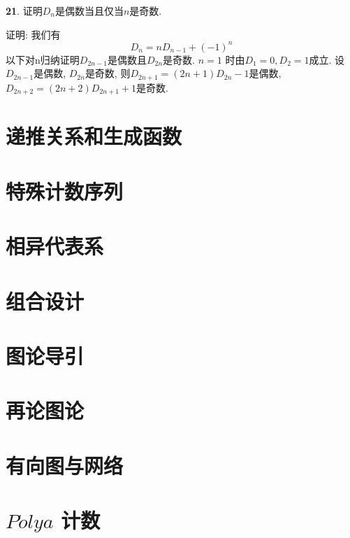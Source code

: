 \documentclass[12pt,a4paper]{article}
\begin{document}
\begin{CJK*}{GBK}{song}
\par \textbf{21}. 证明$D_n$是偶数当且仅当$n$是奇数.
\par 证明: 我们有
\begin{displaymath}
D_n=nD_{n-1}+(-1)^n
\end{displaymath}
以下对n归纳证明$D_{2n-1}$是偶数且$D_{2n}$是奇数. $n=1$ 时由$D_1=0,D_2=1$成立. 设$D_{2n-1}$是偶数, $D_{2n}$是奇数, 则$D_{2n+1}=(2n+1)D_{2n}-1$是偶数, $D_{2n+2}=(2n+2)D_{2n+1}+1$是奇数.

\section{递推关系和生成函数}

\section{特殊计数序列}

\section{相异代表系}

\section{组合设计}

\section{图论导引}

\section{再论图论}

\section{有向图与网络}

\section{$P\acute{o}lya$ 计数}

\end{CJK*}
\end{document}

